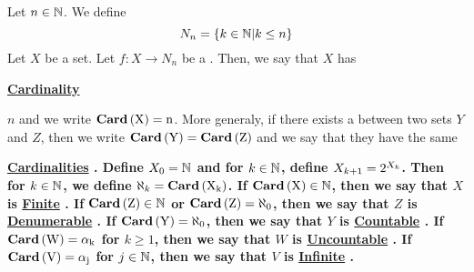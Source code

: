 \newcommand{\Cardinal}[0]{
    \bf \hyperref[def:Cardinality]{Cardinal} \rm
}
\newcommand{\Cardinals}[0]{
    \bf \hyperref[def:Cardinality]{Cardinals} \rm
}
\newcommand{\Cardinality}[0]{
    \bf \hyperref[def:Cardinality]{Cardinality} \rm
}
\newcommand{\Cardinalities}[0]{
    \bf \hyperref[def:Cardinality]{Cardinalities} \rm
}
\newcommand{\FirstNaturals}[1]{
    N_{#1}
}
\newcommand{\CardinalityFunction}[1]{
    \bf
    Card
    \rm
    \pa{#1}
}
\newcommand{\Finite}[0]{
    \bf \hyperref[def:Cardinality]{Finite} \rm
}
\newcommand{\Infinite}[0]{
    \bf \hyperref[def:Cardinality]{Infinite} \rm
}
\newcommand{\Denumerable}[0]{
    \bf \hyperref[def:Cardinality]{Denumerable} \rm
}
\newcommand{\Countable}[0]{
    \bf \hyperref[def:Cardinality]{Countable} \rm
}
\newcommand{\Uncountable}[0]{
    \bf \hyperref[def:Cardinality]{Uncountable} \rm
}\begin{df}[Cardinality]
\label{def:Cardinality}

\rm
    Let $n \in \mathbb{N}$. We define 
    \begin{equation*}
        \FirstNaturals{n}=\{ k \in \N | k \leq n\}
    \end{equation*}
    Let $X$ be a set.
    Let $f:X \to \FirstNaturals{n}$ 
    be a 
    \Bijection. 
    Then, we say that 
    $X$ has 
    \Cardinality
    $n$
    and we write 
    $\CardinalityFunction{X}=n$.
    More generaly, if there exists a 
    \Bijection
    between two sets 
    $Y$ and $Z$, then we write
    $\CardinalityFunction{Y}=\CardinalityFunction{Z}$
    and we say that they have the same 
    \Cardinalities. 
    Define
    $X_0=\mathbb{N}$
    and for $k \in \mathbb{N}$, define 
    $X_{k+1} = 2^{X_k}$. 
    Then for $k \in \mathbb{N}$, we define 
    $\aleph_k = \CardinalityFunction{X_k}$.
    If $\CardinalityFunction{X} \in \N$, then 
    we say that $X$ is \Finite. 
    If $\CardinalityFunction{Z} \in \N$ or 
    $\CardinalityFunction{Z} = \aleph_0$, 
    then we say that $Z$ is \Denumerable.
    If $\CardinalityFunction{Y} = \aleph_0$, then
    we say that $Y$ is \Countable.
    If $\CardinalityFunction{W}= \alpha_k$ for $k \geq 1$, 
    then we say that $W$ is \Uncountable. 
    If $\CardinalityFunction{V} = \alpha_j$ for $j \in \mathbb{N}$, 
    then we say that $V$ is \Infinite. 


\end{df}



